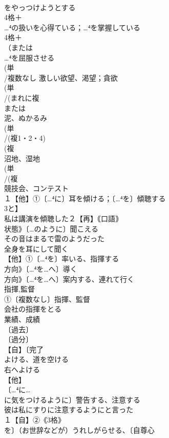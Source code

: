 \documentclass[8pt]{extreport}
\begin{document}
\begin{CJK}{UTF8}{min}
\\	をやっつけようとする
\\	4格＋
\\	…⁴の扱いを心得ている；…⁴を掌握している
\\	4格＋
\\	（または
\\	…⁴を屈服させる
\\	(単
\\	/複数なし 激しい欲望、渇望；貪欲
\\	(単
\\	/(まれに複
\\	または
\\	泥、ぬかるみ 
\\	(単
\\	/(複1・2・4)
\\	(複
\\	沼地、湿地 
\\	(単
\\	/(複
\\	競技会、コンテスト 
\\	１【他】①〔…⁴に〕耳を傾ける；〔…⁴を〕傾聴する 
\\	3と】
\\	私は講演を傾聴した２【再】｟口語｠
\\	状態》〔…のように〕聞こえる 
\\	その音はまるで雷のようだった
\\	全身を耳にして聞く
\\	【他】①〔…⁴を〕率いる、指揮する 
\\	方向》〔…⁴を…へ〕導く 
\\	方向》〔…⁴を…へ〕案内する、連れて行く 
\\	指揮,監督
\\	①〔複数なし〕指揮、監督 
\\	会社の指揮をとる 
\\	業績、成績
\\	〔過去〕
\\	〔過分〕
\\	【自】〔完了
\\	よける、道を空ける 
\\	右へよける
\\	【他】
\\	〔…⁴に…
\\	に気をつけるように〕警告する、注意する 
\\	彼は私にすりに注意するようにと言った
\\	１【自】②《3格》
\\	を〕（お世辞などが）うれしがらせる、〔自尊心

\end{CJK}
\end{document}
